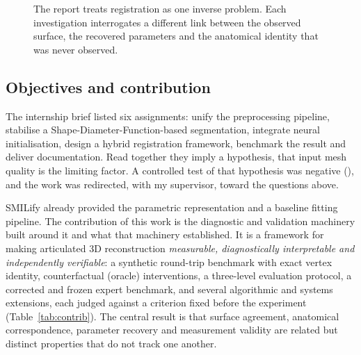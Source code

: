 \begin{figure}[!htb]
\centering
{}
\caption[One inverse problem, several investigations]{The report treats
registration as one inverse problem. Each investigation interrogates a
different link between the observed surface, the recovered parameters and the
anatomical identity that was never observed.}
\label{fig:map}
\end{figure}

\subsection{Objectives and contribution}

The internship brief listed six assignments: unify the preprocessing pipeline,
stabilise a Shape-Diameter-Function-based segmentation, integrate neural
initialisation, design a hybrid registration framework, benchmark the result
and deliver documentation. Read together they imply a hypothesis, that input
mesh quality is the limiting factor. A controlled test of that hypothesis was
negative (), and the work was redirected, with my supervisor, toward the
questions above.

SMILify already provided the parametric representation and a baseline fitting
pipeline. The contribution of this work is the diagnostic and validation
machinery built around it and what that machinery established. It is a
framework for making articulated 3D reconstruction \emph{measurable,
diagnostically interpretable and independently verifiable}: a synthetic
round-trip benchmark with exact vertex identity, counterfactual (oracle)
interventions, a three-level evaluation protocol, a corrected and frozen expert
benchmark, and several algorithmic and systems extensions, each judged against
a criterion fixed before the experiment (Table~\ref{tab:contrib}). The central
result is that surface agreement, anatomical correspondence, parameter
recovery and measurement validity are related but distinct properties that do
not track one another.

